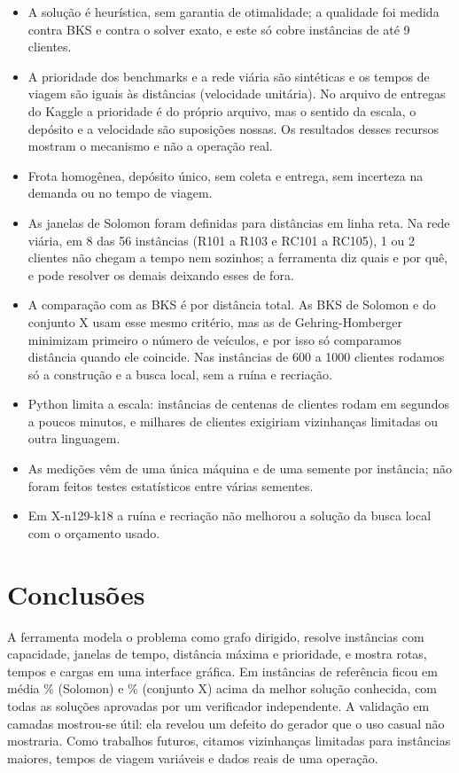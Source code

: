 \documentclass[12pt]{article}
\begin{document}
\begin{itemize}
  \item A solução é heurística, sem garantia de otimalidade; a qualidade foi medida contra BKS e contra o solver exato, e este só cobre instâncias de até 9 clientes.
  \item A prioridade dos benchmarks e a rede viária são sintéticas e os tempos de viagem são iguais às distâncias (velocidade unitária). No arquivo de entregas do Kaggle a prioridade é do próprio arquivo, mas o sentido da escala, o depósito e a velocidade são suposições nossas. Os resultados desses recursos mostram o mecanismo e não a operação real.
  \item Frota homogênea, depósito único, sem coleta e entrega, sem incerteza na demanda ou no tempo de viagem.
  \item As janelas de Solomon foram definidas para distâncias em linha reta. Na rede viária, em 8 das 56 instâncias (R101 a R103 e RC101 a RC105), 1 ou 2 clientes não chegam a tempo nem sozinhos; a ferramenta diz quais e por quê, e pode resolver os demais deixando esses de fora.
  \item A comparação com as BKS é por distância total. As BKS de Solomon e do conjunto X usam esse mesmo critério, mas as de Gehring-Homberger minimizam primeiro o número de veículos, e por isso só comparamos distância quando ele coincide. Nas instâncias de 600 a 1000 clientes rodamos só a construção e a busca local, sem a ruína e recriação.
  \item Python limita a escala: instâncias de centenas de clientes rodam em segundos a poucos minutos, e milhares de clientes exigiriam vizinhanças limitadas ou outra linguagem.
  \item As medições vêm de uma única máquina e de uma semente por instância; não foram feitos testes estatísticos entre várias sementes.
  \item Em X-n129-k18 a ruína e recriação não melhorou a solução da busca local com o orçamento usado.
\end{itemize}

\section{Conclusões}

A ferramenta modela o problema como grafo dirigido, resolve instâncias com capacidade, janelas de tempo, distância máxima e prioridade, e mostra rotas, tempos e cargas em uma interface gráfica. Em instâncias de referência ficou em média \solGapMedio\% (Solomon) e \xGapMedio\% (conjunto X) acima da melhor solução conhecida, com todas as soluções aprovadas por um verificador independente. A validação em camadas mostrou-se útil: ela revelou um defeito do gerador que o uso casual não mostraria. Como trabalhos futuros, citamos vizinhanças limitadas para instâncias maiores, tempos de viagem variáveis e dados reais de uma operação.
\end{document}
